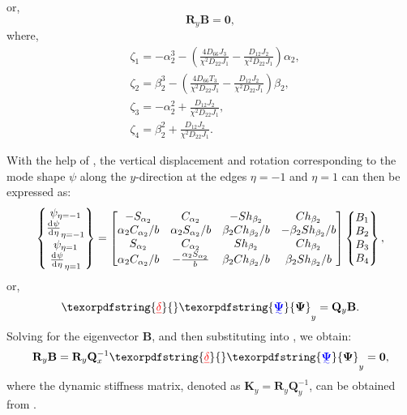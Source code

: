 \documentclass[preprint,12pt,number]{elsarticle}
\newcommand{\id}{\mathrm{d}\mkern1mu}
\providecommand{\DIFaddtex}[1]{{\protect\color{blue}\uwave{#1}}} %
\providecommand{\DIFdeltex}[1]{{\protect\color{red}\sout{#1}}}                      %
\providecommand{\DIFaddbegin}{} %
\providecommand{\DIFaddend}{} %
\providecommand{\DIFdelbegin}{} %
\providecommand{\DIFdelend}{} %
\providecommand{\DIFadd}[1]{\texorpdfstring{\DIFaddtex{#1}}{#1}} %
\providecommand{\DIFdel}[1]{\texorpdfstring{\DIFdeltex{#1}}{}} %
\newcommand{\DIFscaledelfig}{0.5}
\newlength{\DIFdelgraphicswidth} %
\newlength{\DIFdelgraphicsheight} %
\newcommand{\DIFaddincludegraphics}[2][]{{\color{blue}\fbox{\DIFOincludegraphics[#1]{#2}}}} %
\newcommand{\DIFdelincludegraphics}[2][]{%
\sbox{\DIFdelgraphicsbox}{\DIFOincludegraphics[#1]{#2}}%
\settoboxwidth{\DIFdelgraphicswidth}{\DIFdelgraphicsbox} %
\settoboxtotalheight{\DIFdelgraphicsheight}{\DIFdelgraphicsbox} %
\scalebox{\DIFscaledelfig}{%
\parbox[b]{\DIFdelgraphicswidth}{\usebox{\DIFdelgraphicsbox}\\[-\baselineskip] \rule{\DIFdelgraphicswidth}{0em}}\llap{\resizebox{\DIFdelgraphicswidth}{\DIFdelgraphicsheight}{%
\setlength{\unitlength}{\DIFdelgraphicswidth}%
\begin{picture}(1,1)%
\thicklines\linethickness{2pt} %
{\color[rgb]{1,0,0}\put(0,0){\framebox(1,1){}}}%
{\color[rgb]{1,0,0}\put(0,0){\line( 1,1){1}}}%
{\color[rgb]{1,0,0}\put(0,1){\line(1,-1){1}}}%
\end{picture}%
}\hspace*{3pt}}} %
} %
\DeclareRobustCommand{\DIFaddbegin}{\DIFOaddbegin \let\includegraphics\DIFaddincludegraphics} %
\DeclareRobustCommand{\DIFaddend}{\DIFOaddend \let\includegraphics\DIFOincludegraphics} %
\DeclareRobustCommand{\DIFdelbegin}{\DIFOdelbegin \let\includegraphics\DIFdelincludegraphics} %
\DeclareRobustCommand{\DIFdelend}{\DIFOaddend \let\includegraphics\DIFOincludegraphics} %
\begin{document}
%
or,
%
\begin{equation}\label{eq:ABy1}
\mathbf{R}_y \mathbf{B} = \mathbf{0},
\end{equation}
%
where,
%
\begin{equation}\label{eq:gammay}
\begin{split}
	&\zeta_1=-\alpha_2^3-\left( \frac{4D_{66}J_3}{\chi^2D_{22}J_1}  - \frac{D_{12}J_2}{\chi^2D_{22}J_1}  \right)\alpha_2,\\
	&\zeta_2=\beta_2^3-\left( \frac{4D_{66}T_3}{\chi^2D_{22}J_1}  - \frac{D_{12}J_2}{\chi^2D_{22}J_1}  \right)\beta_2,\\
	&\zeta_3=-\alpha_2^2+\frac{D_{12}J_2}{\chi^2D_{22}J_1},\\
	&\zeta_4=\beta_2^2+\frac{D_{12}J_2}{\chi^2D_{22}J_1}.
\end{split}
\end{equation}

With the help of , the vertical displacement and rotation corresponding to the mode shape $\psi$ along the $y$-direction at the edges $\eta = -1$ and $\eta = 1$ can then be expressed as:
%
\begin{equation}\label{eq:UBy}
\begin{split}
	\begin{Bmatrix}
		\psi_{\eta=-1}\\\frac{\id \psi}{\id \eta}_{\eta=-1}\\\psi_{\eta=1}\\\frac{\id \psi}{\id \eta}_{\eta=1}
	\end{Bmatrix}
	= \begin{bmatrix}
		-S_{\alpha_2} & C_{\alpha_2} & -Sh_{\beta_2} & Ch_{\beta_2} \\
		\alpha_2 C_{\alpha_2}/b & \alpha_2 S_{\alpha_2}/b & \beta_2 Ch_{\beta_2}/b & -\beta_2 Sh_{\beta_2}/b \\
		S_{\alpha_2} & C_{\alpha_2} & Sh_{\beta_2} & Ch_{\beta_2} \\
		\alpha_2 C_{\alpha_2}/b & -\frac{\alpha_2 S_{\alpha_2}}{b} & \beta_2 Ch_{\beta_2}/b & \beta_2 Sh_{\beta_2}/b
	\end{bmatrix}
	\begin{Bmatrix}
		B_1\\B_2\\B_3\\B_4
	\end{Bmatrix},		
\end{split}
\end{equation}
%
or,
%
\begin{equation}\label{eq:UBy1}
\DIFdelbegin \DIFdel{\mathbf{\delta}}\DIFdelend \DIFaddbegin \DIFadd{\mathbf{\Psi}}\DIFaddend _y= \mathbf{Q}_y\mathbf{B}.
\end{equation}
%
Solving for the eigenvector $\mathbf{B}$, and then substituting into , we obtain:
%
\begin{equation}\label{eq:DSM_eqy}
\mathbf{R}_y\mathbf{B}=\mathbf{R}_y \mathbf{Q}_x^{-1} 
\DIFdelbegin \DIFdel{\mathbf{\delta}}\DIFdelend \DIFaddbegin \DIFadd{\mathbf{\Psi}}\DIFaddend _y = \mathbf{0},
\end{equation}
%
where the dynamic stiffness matrix, denoted as $\mathbf{K}_y = \mathbf{R}_y \mathbf{Q}_y^{-1}$, can be obtained from .
\end{document}
